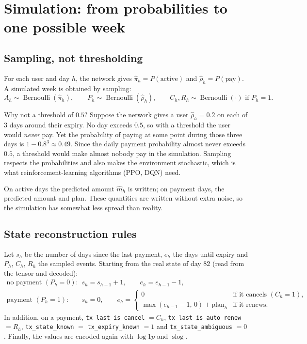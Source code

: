 \documentclass[11pt]{article}
\newcommand{\slog}{\operatorname{slog}}
\newcommand{\Bern}{\operatorname{Bernoulli}}
\newcommand{\code}[1]{\texttt{#1}}
\begin{document}
\section{Simulation: from probabilities to one possible week}
\label{sec:simulation}

\subsection{Sampling, not thresholding}

For each user and day $h$, the network gives $\hat\pi_h = P(\text{active})$ and $\hat\rho_h = P(\text{pay})$. A simulated week is obtained by sampling:
\begin{equation}
A_h \sim \Bern(\hat\pi_h), \qquad P_h \sim \Bern(\hat\rho_h), \qquad
C_h, R_h \sim \Bern(\cdot) \text{ if } P_h = 1 .
\end{equation}

Why not a threshold of $0.5$? Suppose the network gives a user $\hat\rho_h = 0.2$ on each of 3 days around their expiry. No day exceeds $0.5$, so with a threshold the user would \emph{never} pay. Yet the probability of paying at some point during those three days is $1 - 0.8^3 \approx 0.49$. Since the daily payment probability almost never exceeds $0.5$, a threshold would make almost nobody pay in the simulation. Sampling respects the probabilities and also makes the environment stochastic, which is what reinforcement-learning algorithms (PPO, DQN) need.

On active days the predicted amount $\hat m_h$ is written; on payment days, the predicted amount and plan. These quantities are written without extra noise, so the simulation has somewhat less spread than reality.

\subsection{State reconstruction rules}

Let $s_h$ be the number of days since the last payment, $e_h$ the days until expiry and $P_h$, $C_h$, $R_h$ the sampled events. Starting from the real state of day 82 (read from the tensor and decoded):
\begin{align}
\text{no payment } (P_h = 0):\quad & s_h = s_{h-1} + 1, \qquad e_h = e_{h-1} - 1, \\[0.3em]
\text{payment } (P_h = 1):\quad & s_h = 0, \qquad
e_h =
\begin{cases}
0 & \text{if it cancels } (C_h = 1),\\
\max(e_{h-1} - 1,\, 0) + \text{plan}_h & \text{if it renews.}
\end{cases}
\end{align}
In addition, on a payment, \code{tx\_last\_is\_cancel} $= C_h$, \code{tx\_last\_is\_auto\_renew} $= R_h$, \code{tx\_state\_known} $=$ \code{tx\_expiry\_known} $= 1$ and \code{tx\_state\_ambiguous} $= 0$. Finally, the values are encoded again with $\log 1p$ and $\slog$.
\end{document}
